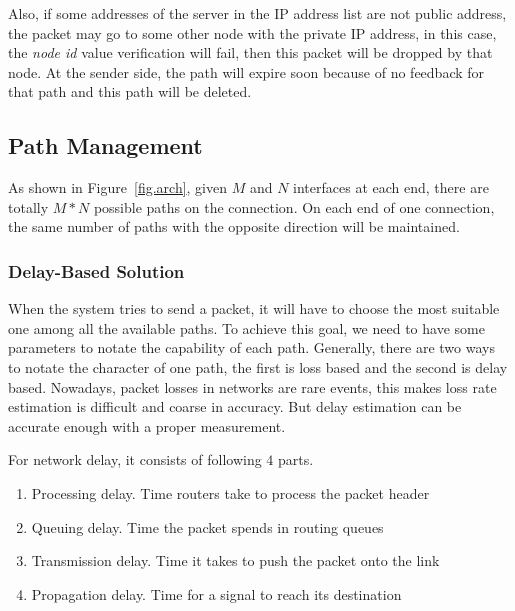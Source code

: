 Also, if some addresses of the server in the IP address list are not public address, the packet may go to some other node with the private IP address, in this case, the \emph{node id} value verification will fail, then this packet will be dropped by that node. At the sender side, the path will expire soon because of no feedback for that path and this path will be deleted. 


\subsection{Path Management}
\label{sec:path}

As shown in Figure~\ref{fig.arch}, given $M$ and $N$ interfaces at each end, there are totally $M*N$ possible paths on the connection. On each end of one connection, the same number of paths with the opposite direction will be maintained.

\subsubsection{Delay-Based Solution}

When the system tries to send a packet, it will have to choose the most suitable one among all the available paths. To achieve this goal, we need to have some parameters to notate the capability of each path. Generally, there are two ways to notate the character of one path, the first is loss based and the second is delay based. Nowadays, packet losses in networks are rare events, this makes loss rate estimation is difficult and coarse in accuracy. But delay estimation can be accurate enough with a proper measurement.

For network delay, it consists of following $4$ parts.

\begin{enumerate}
\item Processing delay. Time routers take to process the packet header
\item Queuing delay. Time the packet spends in routing queues
\item Transmission delay. Time it takes to push the packet onto the link
\item Propagation delay. Time for a signal to reach its destination
\end{enumerate}

